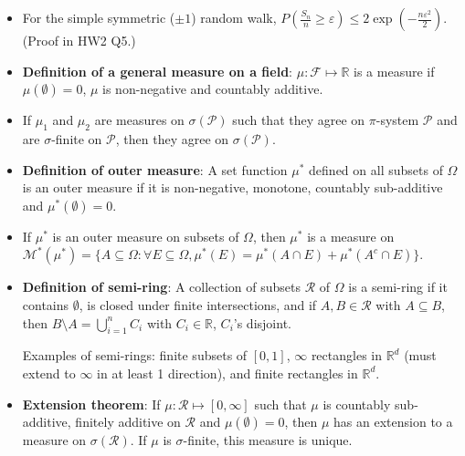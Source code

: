 \documentclass[twoside]{article}
\newcommand\bbR{\mathbb{R}}
\newcommand\calF{\mathcal{F}}
\newcommand\calM{\mathcal{M}}
\newcommand\calP{\mathcal{P}}
\newcommand\calR{\mathcal{R}}
\def\eps{\varepsilon}
\newcommand\Om{\Omega}
\newcommand\sg{\sigma}
\begin{document}
\begin{itemize}
\item For the simple symmetric ($\pm 1$) random walk, $P\left(\frac{S_n}{n} \geq \eps \right) \leq 2 \exp \left( - \frac{n\eps^2}{2} \right)$. (Proof in HW2 Q5.)

\item \textbf{Definition of a general measure on a field}: $\mu: \calF \mapsto \bbR$ is a measure if $\mu (\emptyset) = 0$, $\mu$ is non-negative and countably additive.

\item If $\mu_1$ and $\mu_2$ are measures on $\sg(\calP)$ such that they agree on $\pi$-system $\calP$ and are $\sg$-finite on $\calP$, then they agree on $\sg(\calP)$.

\item \textbf{Definition of outer measure}: A set function $\mu^*$ defined on all subsets of $\Om$ is an outer measure if it is non-negative, monotone, countably sub-additive and $\mu^*(\emptyset) = 0$.

\item If $\mu^*$ is an outer measure on subsets of $\Om$, then $\mu^*$ is a measure on $\calM^*(\mu^*) = \{ A \subseteq \Om: \forall E \subseteq \Om, \mu^*(E) = \mu^*(A \cap E) + \mu^*(A^c \cap E) \}$.

\item \textbf{Definition of semi-ring}: A collection of subsets $\calR$ of $\Om$ is a semi-ring if it contains $\emptyset$, is closed under finite intersections, and if $A, B \in \calR$ with $A \subseteq B$, then $B \setminus A = \displaystyle\bigcup_{i=1}^n C_i$ with $C_i \in \bbR$, $C_i$'s disjoint.

Examples of semi-rings: finite subsets of $[0,1]$, $\infty$ rectangles in $\bbR^d$ (must extend to $\infty$ in at least 1 direction), and finite rectangles in $\bbR^d$.

\item \textbf{Extension theorem}: If $\mu: \calR \mapsto [0, \infty]$ such that $\mu$ is countably sub-additive, finitely additive on $\calR$ and $\mu(\emptyset) = 0$, then $\mu$ has an extension to a measure on $\sg(\calR)$. If $\mu$ is $\sg$-finite, this measure is unique.

\end{itemize}

\end{document}
